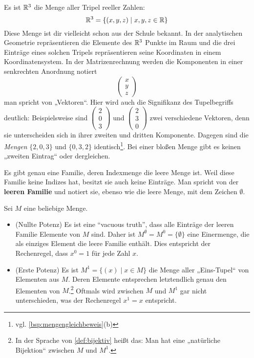 \begin{bsp}
    Es ist $\mathbb R^3$ die Menge aller Tripel reeller Zahlen:
        \[ \mathbb R^3 = \{(x,y,z) \mid x,y,z\in \mathbb R \} \]
    Diese Menge ist dir vielleicht schon aus der Schule bekannt. In der analytischen Geometrie repräsentieren die Elemente des $\mathbb R^3$ Punkte im Raum und die drei Einträge eines solchen Tripels repräsentieren seine Koordinaten in einem Koordinatensystem. In der Matrizenrechnung werden die Komponenten in einer senkrechten Anordnung notiert
    \[\begin{pmatrix}
        x \\ y \\ z 
    \end{pmatrix} \]
    man spricht von „Vektoren“. Hier wird auch die Signifikanz des Tupelbegriffs deutlich: Beispielsweise sind $\begin{pmatrix} 2 \\ 0 \\ 3 \end{pmatrix}$ und $\begin{pmatrix} 2 \\ 3 \\ 0 \end{pmatrix}$ zwei verschiedene Vektoren, denn sie unterscheiden sich in ihrer zweiten und dritten Komponente. Dagegen sind die \emph{Mengen} $\{2,0,3\}$ und $\{0,3,2\}$ identisch\footnote{vgl. \cref{bsp:mengengleichbeweis}(b)}. Bei einer bloßen Menge gibt es keinen „zweiten Eintrag“ oder dergleichen.
\end{bsp}


\begin{de} \label{def:leerefam}
    Es gibt genau eine Familie, deren Indexmenge die leere Menge ist. Weil diese Familie keine Indizes hat, besitzt sie auch keine Einträge. Man spricht von der \textbf{leeren Familie} und notiert sie, ebenso wie die leere Menge, mit dem Zeichen $\emptyset$.
\end{de}


\begin{bem}
    Sei $M$ eine beliebige Menge.
    \begin{itemize}
        \item(Nullte Potenz) Es ist eine ``vacuous truth'', dass alle Einträge der leeren Familie Elemente von $M$ sind. Daher ist $M^\emptyset=M^0 = \{\emptyset\}$ eine Einermenge, die als einziges Element die leere Familie enthält. Dies entspricht der Rechenregel, dass $x^0=1$ für jede Zahl $x$.
        \item(Erste Potenz) Es ist $M^1 = \{(x)\mid x\in M\}$ die Menge aller „Eins-Tupel“ von Elementen aus $M$. Deren Elemente entsprechen letztendlich genau den Elementen von $M$.\footnote{In der Sprache von \cref{def:bijektiv} heißt das: Man hat eine „natürliche Bijektion“ zwischen $M$ und $M^1$.} Oftmals wird zwischen $M$ und $M^1$ gar nicht unterschieden, was der Rechenregel $x^1=x$ entspricht.
    \end{itemize}
\end{bem}





